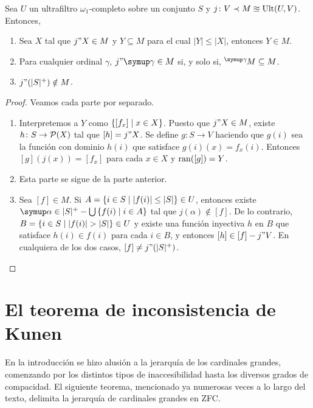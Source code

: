 \begin{teo}
    Sea $U$ un ultrafiltro $\omega_1$-completo sobre un conjunto $S$ y
    $j\colon V\prec M\approxeq\operatorname{Ult}(U,V)$. Entonces,
    \begin{enumerate}[label=\alph*)]
        \item Sea $X$ tal que $j"X\in M$ y $Y\subseteq M$ para el cual $|Y|\leq|X|$,
            entonces $Y\in M$.
        \item Para cualquier ordinal $\gamma$, $j"\gamma\in M$ si, y solo si,
            $\hbox{}^\gamma\kern-1pt M\subseteq M$.
        \item $j"(|S|^+)\notin M$.
    \end{enumerate}
\end{teo}

\begin{proof} Veamos cada parte por separado.
    \begin{enumerate}[label=\alph*)]
        \item Interpretemos a $Y$ como $\left\{ [f_x]\mid x\in X \right\}$. Puesto que $j"X\in M$,
            existe $h\colon S\to\pwset{X}$ tal que $[h]=j"X$. Se define $g\colon S\to V$
            haciendo que $g(i)$ sea la función con dominio $h(i)$ que satisface
            $g(i)(x) = f_x(i)$. Entonces $[g](j(x)) = [f_x]$ para cada $x\in X$ y
            $\operatorname{ran}([g]) = Y$.
        \item Esta parte se sigue de la parte anterior.
        \item Sea $[f]\in M$. Si $A = \left\{ i\in S\mid |f(i)|\leq|S| \right\}\in U$,
            entonces existe $\alpha\in|S|^+ - \bigcup\set{f(i)\mid i\in A}$ tal que
            $j(\alpha)\notin [f]$. De lo contrario, $B=\set{i\in S\mid |f(i)|>|S|}\in U$
            y existe una función inyectiva $h$ en $B$ que satisface $h(i)\in f(i)$
            para cada $i\in B$, y entonces $[h]\in[f]-j"V$. En cualquiera de los dos casos,
            $[f]\neq j"(|S|^+)$.
    \end{enumerate}
\end{proof}

\fi
\ifmainproofs
\chapter{El teorema de inconsistencia de Kunen}

En la introducción se hizo alusión a la jerarquía de los cardinales grandes,
comenzando por los distintos tipos de inaccesibilidad hasta los diversos
grados de compacidad. El siguiente teorema, mencionado ya numerosas veces a lo largo
del texto, delimita la jerarquía de cardinales grandes en ZFC.

